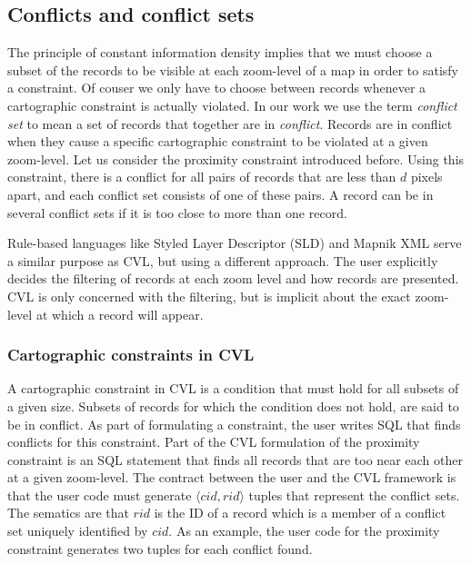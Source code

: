 \subsection{Conflicts and conflict sets}
\label{sec:conflicts}
The principle of constant information density implies that we must choose a subset of the records to be visible at each zoom-level of a map in order to satisfy a constraint. Of couser we only have to choose between records whenever a cartographic constraint is actually violated. In our work we use the term \emph{conflict set} to mean a set of records that together are in \emph{conflict}. Records are in conflict when they cause a specific cartographic constraint to be violated at a given zoom-level. Let us consider the proximity constraint introduced before. Using this constraint, there is a conflict for all pairs of records that are less than $d$ pixels apart, and each conflict set consists of one of these pairs. A record can be in several conflict sets if it is too close to more than one record.

Rule-based languages like Styled Layer Descriptor (SLD)  and Mapnik XML serve a similar purpose as CVL, but using a different approach. The user explicitly decides the filtering of records at each zoom level and how records are presented. CVL is only concerned with the filtering, but is implicit about the exact zoom-level at which a record will appear.



\subsubsection{Cartographic constraints in CVL}
\label{sec:cartographic-constraints-in-cvl}
A cartographic constraint in CVL is a condition that must hold for all subsets of a given size. Subsets of records for which the condition does not hold, are said to be in conflict. As part of formulating a constraint, the user writes SQL that finds conflicts for this constraint. Part of the CVL formulation of the proximity constraint is an SQL statement that finds all records that are too near each other at a given zoom-level. The contract between the user and the CVL framework is that the user code must generate $\langle cid, rid \rangle$ tuples that represent the conflict sets. The sematics are that $rid$ is the ID of a record which is a member of a conflict set uniquely identified by $cid$. As an example, the user code for the proximity constraint generates two tuples for each conflict found.

